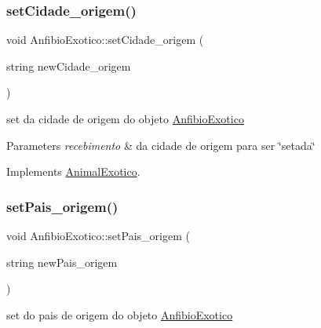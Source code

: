 \mbox{\label{class_anfibio_exotico_a34c761351fcacbdd519d3c5ab047f974}} 
\subsubsection{\texorpdfstring{setCidade\_origem()}{setCidade\_origem()}}
{\footnotesize\ttfamily void Anfibio\+Exotico\+::set\+Cidade\+\_\+origem (\begin{DoxyParamCaption}\item[{string}]{new\+Cidade\+\_\+origem }\end{DoxyParamCaption})\hspace{0.3cm}{\ttfamily [virtual]}}



set da cidade de origem do objeto \mbox{\hyperlink{class_anfibio_exotico}{Anfibio\+Exotico}} 


\begin{DoxyParams}{Parameters}
{\em recebimento} & da cidade de origem para ser \char`\"{}setada\char`\"{} \\
\hline
\end{DoxyParams}


Implements \mbox{\hyperlink{class_animal_exotico}{Animal\+Exotico}}.

\mbox{\label{class_anfibio_exotico_a32f78e330f8f78df40ab147ac1e074b2}} 
\subsubsection{\texorpdfstring{setPais\_origem()}{setPais\_origem()}}
{\footnotesize\ttfamily void Anfibio\+Exotico\+::set\+Pais\+\_\+origem (\begin{DoxyParamCaption}\item[{string}]{new\+Pais\+\_\+origem }\end{DoxyParamCaption})\hspace{0.3cm}{\ttfamily [virtual]}}



set do pais de origem do objeto \mbox{\hyperlink{class_anfibio_exotico}{Anfibio\+Exotico}} 


